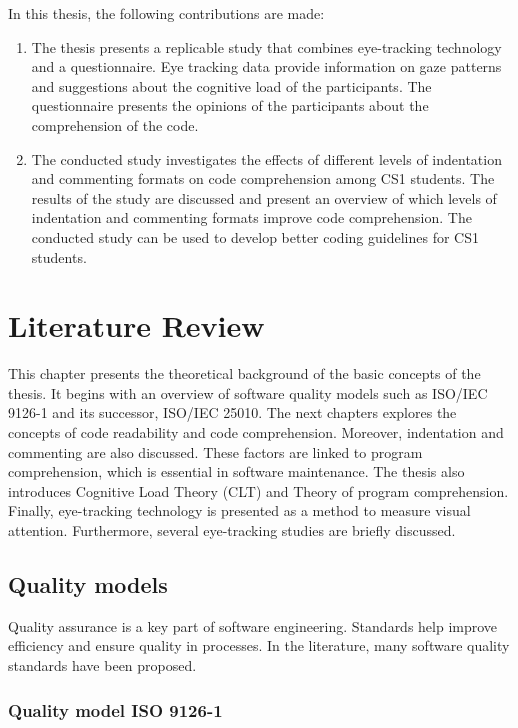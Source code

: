 In this thesis, the following contributions are made:
\begin{enumerate}

\item The thesis presents a replicable study that combines eye-tracking technology and a questionnaire. Eye tracking data provide information on gaze patterns and suggestions about the cognitive load of the participants. The questionnaire presents the opinions of the participants about the comprehension of the code.

\item  The conducted study investigates the effects of different levels of indentation and commenting formats on code comprehension among CS1 students. The results of the study are discussed and present an overview of which levels of indentation and commenting formats improve code comprehension. The conducted study can be used to develop better coding guidelines for CS1 students.

\end{enumerate}

\chapter{Literature Review}
This chapter presents the theoretical background of the basic concepts of the thesis. It begins with an overview of software quality models such as ISO/IEC 9126-1 and its successor, ISO/IEC 25010. The next chapters explores the concepts of code readability and code comprehension. Moreover, indentation and commenting are also discussed. These factors are  linked to program comprehension, which is essential in software maintenance. The thesis also introduces Cognitive Load Theory (CLT) and Theory of program comprehension. Finally,  eye-tracking technology is presented as a method to measure visual attention. Furthermore, several eye-tracking studies are briefly discussed. 



\section{Quality models}
Quality assurance is a key part of software engineering. Standards help improve efficiency and ensure quality in  processes. In the literature, many software quality standards have been proposed.

 

\subsection{Quality model ISO 9126-1}

